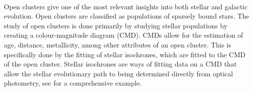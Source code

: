 %
%
%
%

\smallskip
{}
\smallskip\\
Open clusters give one of the most relevant insights into both stellar and galactic evolution. Open clusters are classified as populations of sparsely bound stars.
The study of open clusters is done primarily by studying stellar populations by creating a colour-magnitude diagram (CMD). CMDs allow for the estimation of age, distance, metallicity, among other attributes of an open cluster. This is specifically done by the fitting of stellar isochrones, which are fitted to the CMD of the open cluster. Stellar isochrones are ways of fitting data on a CMD that allow the stellar evolutionary path to being determined directly from optical photometry, see \cite{1990BAAS...22.1288M} for a comprehensive example.  

